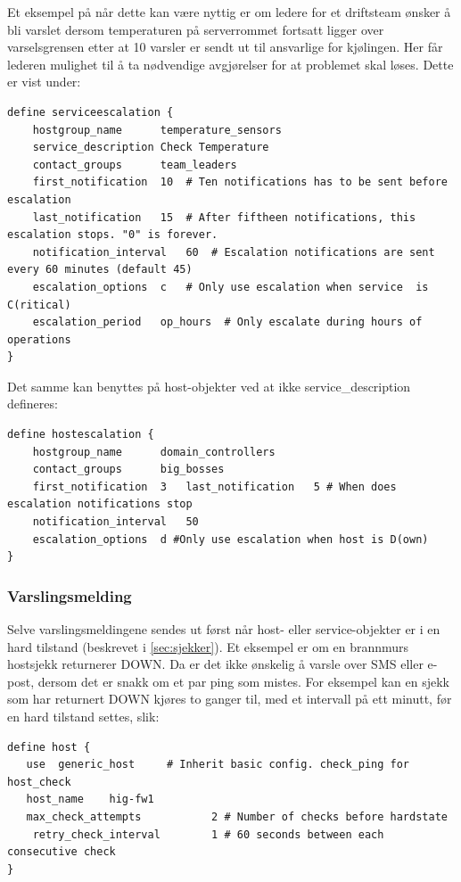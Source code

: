 Et eksempel på når dette kan være nyttig er om ledere for et driftsteam ønsker å bli varslet dersom temperaturen på serverrommet fortsatt ligger over varselsgrensen etter at 10 varsler er sendt ut til ansvarlige for kjølingen. Her får lederen mulighet til å ta nødvendige avgjørelser for at problemet skal løses. Dette er vist under:
\begin{lstlisting}
define serviceescalation {
	hostgroup_name		temperature_sensors
	service_description	Check Temperature
	contact_groups		team_leaders
	first_notification	10	# Ten notifications has to be sent before escalation
	last_notification	15	# After fiftheen notifications, this escalation stops. "0" is forever.
	notification_interval	60 	# Escalation notifications are sent every 60 minutes (default 45)
	escalation_options	c	# Only use escalation when service  is C(ritical)
	escalation_period	op_hours  # Only escalate during hours of operations
}
\end{lstlisting}
Det samme kan benyttes på host-objekter ved at ikke service\_description defineres:
\begin{lstlisting}
define hostescalation {
	hostgroup_name		domain_controllers
	contact_groups		big_bosses
	first_notification	3 	last_notification	5 # When does escalation notifications stop
	notification_interval	50
	escalation_options	d #Only use escalation when host is D(own)
}
\end{lstlisting}

\subsubsection{Varslingsmelding}\label{sec:varslingsmelding}

Selve varslingsmeldingene sendes ut først når host- eller service-objekter er i en hard tilstand (beskrevet i \ref{sec:sjekker}). Et eksempel er om en brannmurs hostsjekk returnerer DOWN. Da er det ikke ønskelig å varsle over SMS eller e-post, dersom det er snakk om et par ping som mistes. For eksempel kan en sjekk som har returnert DOWN kjøres to ganger til, med et intervall på ett minutt, før en hard tilstand settes, slik:

\begin{lstlisting}
define host {
   use 	generic_host     # Inherit basic config. check_ping for host_check
   host_name	hig-fw1
   max_check_attempts           2 # Number of checks before hardstate
    retry_check_interval        1 # 60 seconds between each consecutive check
}
\end{lstlisting}

